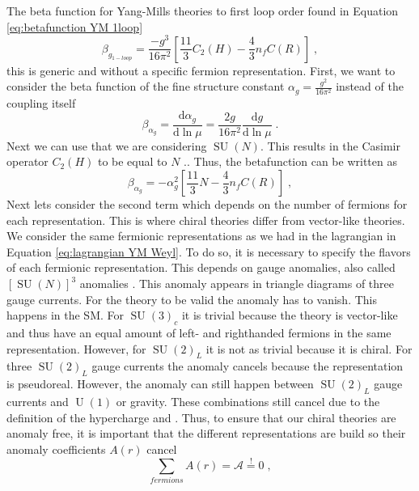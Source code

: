 The beta function for Yang-Mills theories to first loop order found in Equation \ref{eq:betafunction YM 1loop}
\begin{equation}
    \beta_{g_{1-loop}}=\frac{-g^3}{16\pi^2}\left[ \frac{11}{3}C_2(H)-\frac{4}{3}n_fC(R)\right]\;,
\end{equation}
this is generic and without a specific fermion representation. First, we want to consider the beta function of the fine structure constant $\alpha_g=\frac{g^2}{16\pi^2}$ instead of the coupling itself
\begin{equation}
    \beta_{\alpha_g}=\frac{\text{d}\alpha_g}{\text{d}\ln \mu}=\frac{2g}{16\pi^2}\frac{\text{d}g}{\text{d}\ln \mu}\;.
\end{equation}
Next we can use that we are considering $\operatorname{SU}(N)$. This results in the Casimir operator $C_2(H)$ to be equal to $N$ \cite{Peskin:1995ev}.. Thus, the betafunction can be written as
\begin{equation}
    \beta_{\alpha_{g}}={-\alpha_g^2}\left[ \frac{11}{3}N-\frac{4}{3}n_fC(R)\right]\;,
\end{equation}
Next lets consider the second term which depends on the number of fermions for each representation. This is where chiral theories differ from vector-like theories. We consider the same fermionic representations as we had in the lagrangian in Equation \ref{eq:lagrangian YM Weyl}. To do so, it is necessary to specify the flavors of each fermionic representation. This depends on gauge anomalies, also called $\left[\operatorname{SU}(N) \right]^3$ anomalies \cite{Peskin:1995ev}. This anomaly appears in triangle diagrams of three gauge currents. For the theory to be valid the anomaly has to vanish. This happens in the SM. For $\operatorname{SU}(3)_c$ it is trivial because the theory is vector-like and thus have an equal amount of left- and righthanded fermions in the same representation. However, for $\operatorname{SU}(2)_L$ it is not as trivial because it is chiral. For three $\operatorname{SU}(2)_L$ gauge currents the anomaly cancels because the representation is pseudoreal. However, the anomaly can still happen between $\operatorname{SU}(2)_L$ gauge currents and $\operatorname{U}(1)$ or gravity. These combinations still cancel due to the definition of the hypercharge and  \cite{Peskin:1995ev}. 
Thus, to ensure that our chiral theories are anomaly free, it is important that the different representations are build so their anomaly coefficients $A(r)$ cancel
\begin{equation}
    \sum_{fermions}A(r)=\mathcal{A}\overset{!}{=}0\;,
\end{equation}

